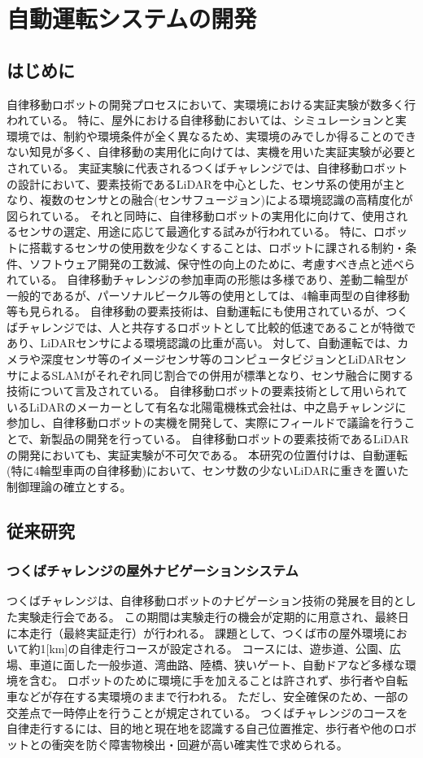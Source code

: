 \chapter{自動運転システムの開発}
\section{はじめに}

自律移動ロボットの開発プロセスにおいて、実環境における実証実験が数多く行われている。
特に、屋外における自律移動においては、シミュレーションと実環境では、制約や環境条件が全く異なるため、実環境のみでしか得ることのできない知見が多く、自律移動の実用化に向けては、実機を用いた実証実験が必要とされている。
実証実験に代表されるつくばチャレンジでは、自律移動ロボットの設計において、要素技術であるLiDARを中心とした、センサ系の使用が主となり、複数のセンサとの融合(センサフュージョン)による環境認識の高精度化が図られている。
それと同時に、自律移動ロボットの実用化に向けて、使用されるセンサの選定、用途に応じて最適化する試みが行われている。
特に、ロボットに搭載するセンサの使用数を少なくすることは、ロボットに課される制約・条件、ソフトウェア開発の工数減、保守性の向上のために、考慮すべき点と述べられている。
自律移動チャレンジの参加車両の形態は多様であり、差動二輪型が一般的であるが、パーソナルビークル等の使用としては、4輪車両型の自律移動等も見られる。
自律移動の要素技術は、自動運転にも使用されているが、つくばチャレンジでは、人と共存するロボットとして比較的低速であることが特徴であり、LiDARセンサによる環境認識の比重が高い。
対して、自動運転では、カメラや深度センサ等のイメージセンサ等のコンピュータビジョンとLiDARセンサによるSLAMがそれぞれ同じ割合での併用が標準となり、センサ融合に関する技術について言及されている。
自律移動ロボットの要素技術として用いられているLiDARのメーカーとして有名な北陽電機株式会社は、中之島チャレンジに参加し、自律移動ロボットの実機を開発して、実際にフィールドで議論を行うことで、新製品の開発を行っている。
自律移動ロボットの要素技術であるLiDARの開発においても、実証実験が不可欠である。
本研究の位置付けは、自動運転(特に4輪型車両の自律移動)において、センサ数の少ないLiDARに重きを置いた制御理論の確立とする。


\section{従来研究}
\subsection{つくばチャレンジの屋外ナビゲーションシステム}
つくばチャレンジ\cite{auto:tsukuba}は、自律移動ロボットのナビゲーション技術の発展を目的とした実験走行会である。
この期間は実験走行の機会が定期的に用意され、最終日に本走行（最終実証走行）が行われる。
課題として、つくば市の屋外環境において約1[km]の自律走行コースが設定される。
コースには、遊歩道、公園、広場、車道に面した一般歩道、湾曲路、陸橋、狭いゲート、自動ドアなど多様な環境を含む。
ロボットのために環境に手を加えることは許されず、歩行者や自転車などが存在する実環境のままで行われる。
ただし、安全確保のため、一部の交差点で一時停止を行うことが規定されている。
つくばチャレンジのコースを自律走行するには、目的地と現在地を認識する自己位置推定、歩行者や他のロボットとの衝突を防ぐ障害物検出・回避が高い確実性で求められる。

